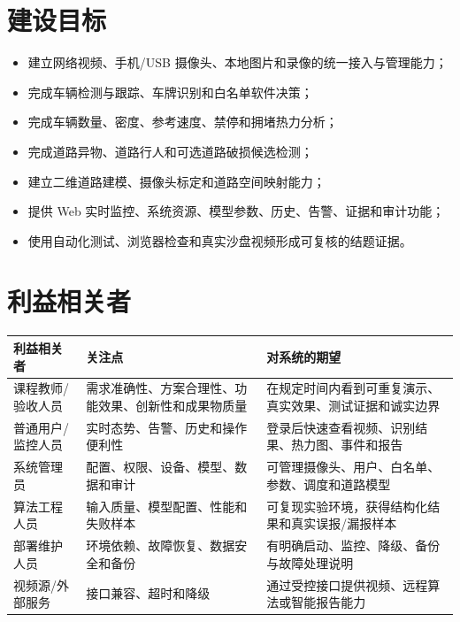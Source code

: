 \section{建设目标}\label{requirements-ux5efaux8bbeux76eeux6807}

\begin{itemize}
\tightlist
\item
  建立网络视频、手机/USB 摄像头、本地图片和录像的统一接入与管理能力；
\item
  完成车辆检测与跟踪、车牌识别和白名单软件决策；
\item
  完成车辆数量、密度、参考速度、禁停和拥堵热力分析；
\item
  完成道路异物、道路行人和可选道路破损候选检测；
\item
  建立二维道路建模、摄像头标定和道路空间映射能力；
\item
  提供 Web 实时监控、系统资源、模型参数、历史、告警、证据和审计功能；
\item
  使用自动化测试、浏览器检查和真实沙盘视频形成可复核的结题证据。
\end{itemize}

\section{利益相关者}\label{requirements-ux5229ux76caux76f8ux5173ux8005}

\begin{longtable}[]{@{}
  >{\raggedright\arraybackslash}p{}
  >{\raggedright\arraybackslash}p{}
  >{\raggedright\arraybackslash}p{}@{}}
\toprule\noalign{}
\begin{minipage}[b]{\linewidth}\raggedright
利益相关者
\end{minipage} & \begin{minipage}[b]{\linewidth}\raggedright
关注点
\end{minipage} & \begin{minipage}[b]{\linewidth}\raggedright
对系统的期望
\end{minipage} \\
\midrule\noalign{}
\endhead
\bottomrule\noalign{}
\endlastfoot
课程教师/验收人员 & 需求准确性、方案合理性、功能效果、创新性和成果物质量 & 在规定时间内看到可重复演示、真实效果、测试证据和诚实边界 \\
普通用户/监控人员 & 实时态势、告警、历史和操作便利性 & 登录后快速查看视频、识别结果、热力图、事件和报告 \\
系统管理员 & 配置、权限、设备、模型、数据和审计 & 可管理摄像头、用户、白名单、参数、调度和道路模型 \\
算法工程人员 & 输入质量、模型配置、性能和失败样本 & 可复现实验环境，获得结构化结果和真实误报/漏报样本 \\
部署维护人员 & 环境依赖、故障恢复、数据安全和备份 & 有明确启动、监控、降级、备份与故障处理说明 \\
视频源/外部服务 & 接口兼容、超时和降级 & 通过受控接口提供视频、远程算法或智能报告能力 \\
\end{longtable}

